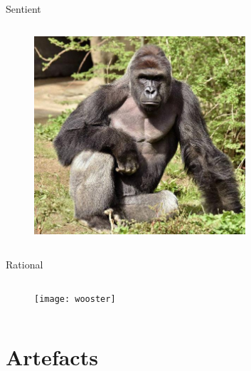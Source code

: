 \documentclass[xcolor=dvipsnames]{beamer}
\begin{document}
\begin{frame}[fragile]{Sentient}
  \begin{columns}[T] %
    \begin{column}{0.99\textwidth}
      \begin{figure}[H]
        \centering
        \includegraphics[width=0.7\textwidth]{gorilla}
      \end{figure}
    \end{column}%
  \end{columns}
\end{frame}


\begin{frame}[fragile]{Rational}
  \begin{columns}[T] %
    \begin{column}{0.99\textwidth}
      \begin{figure}[H]
        \centering
        \texttt{[image: wooster]}
      \end{figure}
    \end{column}%
  \end{columns}
\end{frame}


\section{Artefacts}
\end{document}
